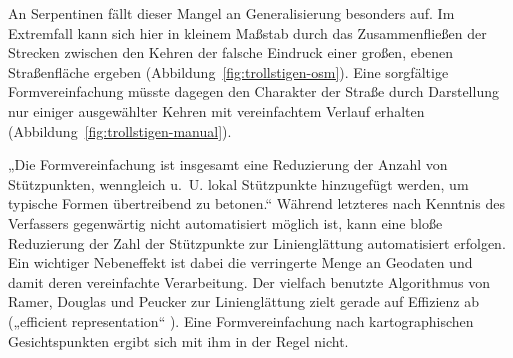 \documentclass[../main/thesis.tex]{subfiles}
\begin{document}

An Serpentinen fällt dieser Mangel an Generalisierung besonders auf.
Im Extremfall kann sich hier in kleinem Maßstab durch das Zusammenfließen der Strecken zwischen den Kehren der falsche Eindruck einer großen, ebenen Straßenfläche ergeben (Abbildung~\ref{fig:trollstigen-osm}).
Eine sorgfältige Formvereinfachung müsste dagegen den Charakter der Straße durch Darstellung nur einiger ausgewählter Kehren mit vereinfachtem Verlauf erhalten (Abbildung~\ref{fig:trollstigen-manual}).

„Die Formvereinfachung ist insgesamt eine Reduzierung der Anzahl von Stützpunkten, wenngleich u.~U. lokal Stützpunkte hinzugefügt werden, um typische Formen übertreibend zu betonen.“ 
Während letzteres nach Kenntnis des Verfassers gegenwärtig nicht automatisiert möglich ist, kann eine bloße Reduzierung der Zahl der Stützpunkte zur Linienglättung automatisiert erfolgen.
Ein wichtiger Nebeneffekt ist dabei die verringerte Menge an Geodaten und damit deren vereinfachte Verarbeitung.
Der vielfach benutzte Algorithmus von Ramer, Douglas und Peucker zur Linienglättung zielt gerade auf Effizienz ab („efficient representation“ ).
Eine Formvereinfachung nach kartographischen Gesichtspunkten ergibt sich mit ihm in der Regel nicht.
\end{document}
